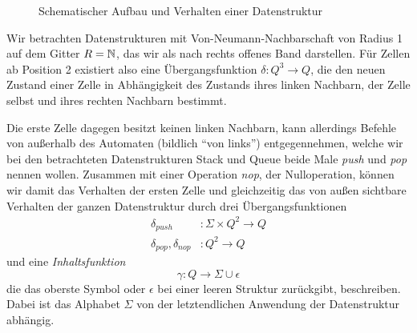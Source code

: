 \documentclass{article}
\begin{document}
\begin{figure}[h]
    \centering
    \caption{Schematischer Aufbau und Verhalten einer Datenstruktur}
\end{figure}
Wir betrachten Datenstrukturen mit Von-Neumann-Nachbarschaft von Radius 1 auf dem Gitter $R = \mathbb{N}$, das wir als nach rechts offenes Band darstellen. Für Zellen ab Position 2 existiert also eine Übergangsfunktion $\delta : Q^3 \rightarrow Q$, die den neuen Zustand einer Zelle in Abhängigkeit des Zustands ihres linken Nachbarn, der Zelle selbst und ihres rechten Nachbarn bestimmt.

Die erste Zelle dagegen besitzt keinen linken Nachbarn, kann allerdings Befehle von außerhalb des Automaten (bildlich "`von links"') entgegennehmen, welche wir bei den betrachteten Datenstrukturen Stack und Queue beide Male \emph{push} und \emph{pop} nennen wollen. Zusammen mit einer Operation \emph{nop}, der Nulloperation, können wir damit das Verhalten der ersten Zelle und gleichzeitig das von außen sichtbare Verhalten der ganzen Datenstruktur durch drei Übergangsfunktionen
\begin{align*}
    \delta_{push} &: \Sigma \times Q^2 \rightarrow Q \\
    \delta_{pop}, \delta_{nop} &: Q^2 \rightarrow Q
\end{align*}
und eine \emph{Inhaltsfunktion}
\[ \gamma : Q \rightarrow \Sigma \cup {\epsilon} \]
die das oberste Symbol oder $\epsilon$ bei einer leeren Struktur zurückgibt, beschreiben. Dabei ist das Alphabet $\Sigma$ von der letztendlichen Anwendung der Datenstruktur abhängig.
\end{document}
